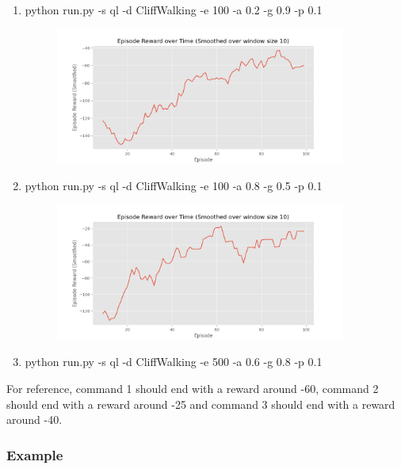 \documentclass[a4paper]{article}
\theoremstyle{definition}
\newenvironment{soln}{
    \leavevmode\color{blue}\ignorespaces
}{}
\begin{document}
\pagebreak
\begin{enumerate}
	\item  python run.py -s ql -d CliffWalking -e 100 -a 0.2 -g 0.9 -p 0.1
	      \begin{soln}
		      \begin{figure}[H]
			      \centering
			      \includegraphics[width=0.9\textwidth]{img/ql_1.png}
		      \end{figure}
	      \end{soln}
	\item  python run.py -s ql -d CliffWalking -e 100 -a 0.8 -g 0.5 -p 0.1
	      \begin{soln}
		      \begin{figure}[H]
			      \centering
			      \includegraphics[width=0.9\textwidth]{img/ql_2.png}
		      \end{figure}
	      \end{soln}
	\item  python run.py -s ql -d CliffWalking -e 500 -a 0.6 -g 0.8 -p 0.1
\end{enumerate}

For reference, command 1 should end with a reward around -60, command 2 should end with a reward around -25 and command 3 should end with a reward around -40.

\subsubsection*{Example}
\end{document}
